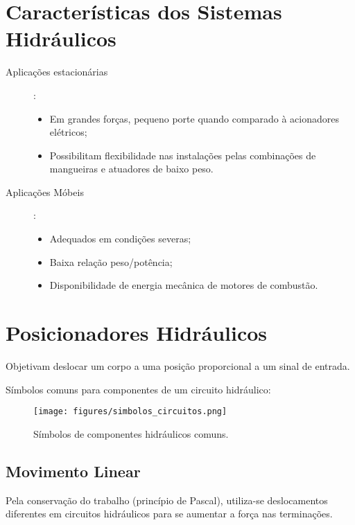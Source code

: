 
\section*{Características dos Sistemas Hidráulicos}

\begin{description}
    \item[Aplicações estacionárias]:
	\begin{itemize}
	    \item Em grandes forças, pequeno porte quando comparado à acionadores elétricos;
		\item Possibilitam flexibilidade nas instalações pelas combinações de mangueiras e atuadores de baixo peso.
	\end{itemize}
    \item[Aplicações Móbeis]:
	\begin{itemize}
	    \item Adequados em condições severas;
	    \item Baixa relação peso/potência;
	    \item Disponibilidade de energia mecânica de motores de combustão.
	\end{itemize}
\end{description}

\section*{Posicionadores Hidráulicos}

Objetivam deslocar um corpo a uma posição proporcional a um sinal de entrada.

Símbolos comuns para componentes de um circuito hidráulico:

\begin{figure}[H]
    \centering
    \texttt{[image: figures/simbolos\_circuitos.png]}
    \caption{Símbolos de componentes hidráulicos comuns.}
    \label{fig:figures-simbolos_circuitos-png}
\end{figure}

\subsection*{Movimento Linear}

Pela conservação do trabalho (princípio de Pascal), utiliza-se deslocamentos diferentes em circuitos hidráulicos para se aumentar a força nas terminações.

